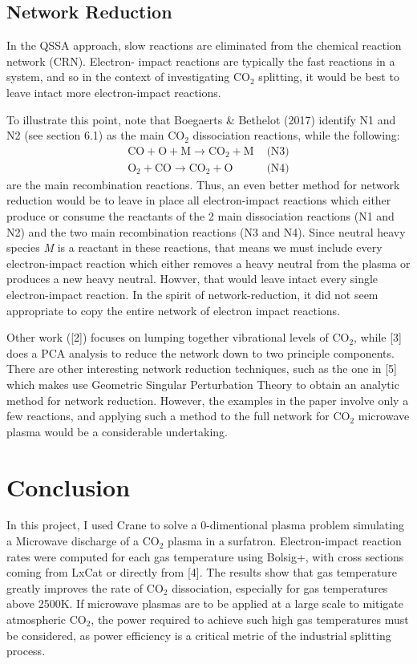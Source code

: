 \documentclass[twocolumn,10pt,a4paper]{article}
\begin{document}
\subsection{Network Reduction}
In the QSSA approach, slow reactions are eliminated from the chemical reaction network (CRN). Electron-
impact reactions are typically the fast reactions in a system, and so in the context of investigating
CO$_2$ splitting, it would be best to leave intact more electron-impact reactions.

To illustrate this point, note that Boegaerts \& Bethelot (2017) identify N1 and N2 (see section 6.1) as the main CO$_2$
dissociation reactions, while the following:
\begin{align*}
    \text{CO} + \text{O} + \text{M} \longrightarrow \text{CO}_2 + \text{M} & \text{   (N3)}\\
    \text{O}_2 + \text{CO} \longrightarrow \text{CO}_2 + \text{O} & \text{   (N4)}
\end{align*}
are the main recombination reactions. Thus, an even better method for network reduction would be to
leave in place all electron-impact reactions which either produce or consume the reactants of the 2 main
dissociation reactions (N1 and N2) and the two main recombination reactions (N3 and N4). Since neutral heavy
species \textit{M} is a reactant in these reactions, that means we must include every electron-impact reaction
which either removes a heavy neutral from the plasma or produces a new heavy neutral. Howver, that would
leave intact every single electron-impact
reaction. In the spirit of network-reduction, it did not seem appropriate to copy the entire
network of electron impact reactions.

Other work ([2]) focuses on lumping together vibrational levels of CO$_2$, while [3] does a PCA analysis
to reduce the network down to two principle components. There are other interesting network reduction
techniques, such as the one in [5] which makes use Geometric Singular Perturbation Theory to obtain
an analytic method for network reduction. However, the examples in the paper involve only a few reactions,
and applying such a method to the full network for CO$_2$ microwave plasma would be a considerable
undertaking.

\section{Conclusion}
In this project, I used Crane to solve a 0-dimentional plasma problem simulating a Microwave discharge
of a CO$_2$ plasma in a surfatron. Electron-impact reaction rates were computed for each gas temperature
using Bolsig+, with cross sections coming from LxCat or directly from [4]. The results show that gas
temperature greatly improves the rate of CO$_2$ dissociation, especially for gas temperatures above 2500K.
If microwave plasmas are to be applied at a large scale to mitigate atmospheric CO$_2$, the power required
to achieve such high gas temperatures must be considered, as power efficiency is a critical metric of the
industrial splitting process.
\end{document}
